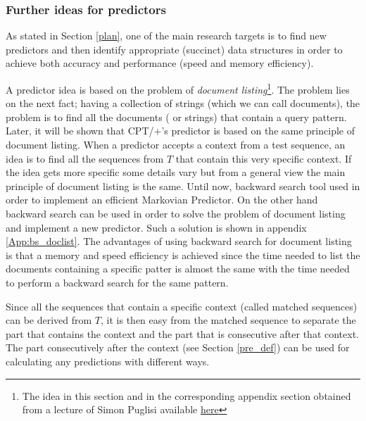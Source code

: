 \subsubsection{Further ideas for predictors}{\label{FurId}}
As stated in Section \ref{plan}, one of the main research targets is to find new predictors and then identify appropriate (succinct) data structures in order to achieve both accuracy and performance (speed and memory efficiency).
\par A predictor idea is based on the problem of \emph{document listing}\footnote{The idea in this section and in the corresponding appendix section obtained from a lecture of Simon Puglisi available \href{https://sites.google.com/site/ku2015topicsindatamining/home/lecture2.2.pdf?attredirects=0&d=1}{here}}. The problem lies on the next fact; having a collection of strings (which we can call documents), the problem is to find all the documents ( or strings) that contain a query pattern. Later, it will be shown that CPT/+'s predictor is based on the same principle of document listing. When a predictor accepts a context from a test sequence, an idea is to find all the sequences from $T$ that contain this very specific context. If the idea gets more specific some details vary but from a general view the main principle of document listing is the same. Until now, backward search tool used in order to implement an efficient Markovian Predictor. On the other hand backward search can be used in order to solve the problem of document listing and implement a new predictor. Such a solution is shown in appendix \ref{App:bs_doclist}. The advantages of using backward search for document listing is that a memory and speed efficiency is achieved since the time needed to list the documents containing a specific patter is almost the same with the time needed to perform a backward search for the same pattern. 
\par Since all the sequences that contain a specific context (called matched sequences) can be derived from $T$, it is then easy from the matched sequence to separate the part that contains the context and the part that is consecutive after that context. The part consecutively after the context (see Section \ref{pre_def}) can be used for calculating any predictions with different ways.

